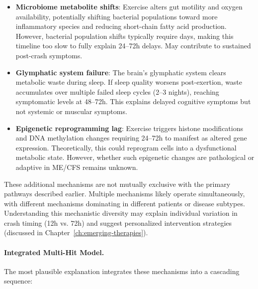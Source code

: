 \begin{itemize}
    \item \textbf{Microbiome metabolite shifts}: Exercise alters gut motility and oxygen availability, potentially shifting bacterial populations toward more inflammatory species and reducing short-chain fatty acid production. However, bacterial population shifts typically require days, making this timeline too slow to fully explain 24--72h delays. May contribute to sustained post-crash symptoms.

    \item \textbf{Glymphatic system failure}: The brain's glymphatic system clears metabolic waste during sleep. If sleep quality worsens post-exertion, waste accumulates over multiple failed sleep cycles (2--3 nights), reaching symptomatic levels at 48--72h. This explains delayed cognitive symptoms but not systemic or muscular symptoms.

    \item \textbf{Epigenetic reprogramming lag}: Exercise triggers histone modifications and DNA methylation changes requiring 24--72h to manifest as altered gene expression. Theoretically, this could reprogram cells into a dysfunctional metabolic state. However, whether such epigenetic changes are pathological or adaptive in ME/CFS remains unknown.
\end{itemize}

These additional mechanisms are not mutually exclusive with the primary pathways described earlier. Multiple mechanisms likely operate simultaneously, with different mechanisms dominating in different patients or disease subtypes. Understanding this mechanistic diversity may explain individual variation in crash timing (12h vs. 72h) and suggest personalized intervention strategies (discussed in Chapter~\ref{ch:emerging-therapies}).

\paragraph{Integrated Multi-Hit Model.}

The most plausible explanation integrates these mechanisms into a cascading sequence:

